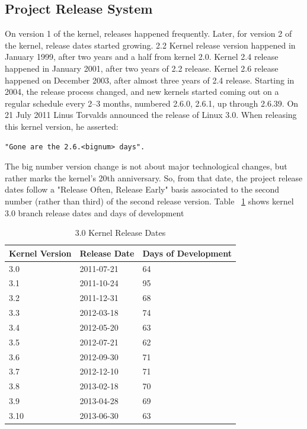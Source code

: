 \documentclass[11pt]{article}
\begin{document}
\subsection{Project Release System}
On version 1 of the kernel, releases happened frequently. Later, for version 2 of the kernel, release dates started growing. 2.2 Kernel release version happened in January 1999, after two years and a half from kernel 2.0. Kernel 2.4 release happened in January 2001, after two years of 2.2 release. Kernel 2.6 release happened on December 2003, after almost three years of 2.4 release. Starting in 2004, the release process changed, and new kernels started coming out on a regular schedule every 2–3 months, numbered 2.6.0, 2.6.1, up through 2.6.39. On 21 July 2011 Linus Torvalds announced the release of Linux 3.0. When releasing this kernel version, he asserted:
\begin{verbatim}
"Gone are the 2.6.<bignum> days".
\end{verbatim}
The big number version change  is not about major technological changes, but rather marks the kernel's 20th anniversary. So, from that date, the project release dates follow a "Release Often, Release Early" basis associated to the second number (rather than third) of the second release version. Table ~\ref{tab:releasedates} shows kernel 3.0 branch release dates and days of development
\begin{table}[H]
  \begin{center}
    \begin{tabular}{ | l | l | l | }
    \hline
    Kernel Version & Release Date & Days of Development\\
    \hline
    3.0  & 2011-07-21 & 64\\
    3.1  & 2011-10-24 & 95\\
    3.2  & 2011-12-31 & 68\\
    3.3  & 2012-03-18 & 74\\
    3.4  & 2012-05-20 & 63\\
    3.5  & 2012-07-21 & 62\\
    3.6  & 2012-09-30 & 71\\
    3.7  & 2012-12-10 & 71\\
    3.8  & 2013-02-18 & 70\\
    3.9  & 2013-04-28 & 69\\
    3.10 & 2013-06-30 & 63\\
    \hline
    \end{tabular}
    \caption{3.0 Kernel Release Dates}
    \label{tab:releasedates}
  \end{center}
\end{table}
\end{document}
